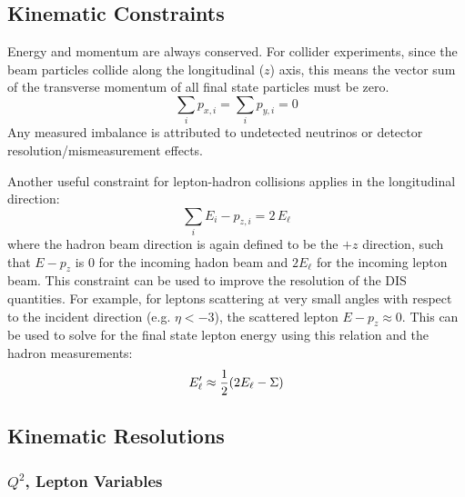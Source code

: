 \documentclass[12pt]{article}
\begin{document}
\subsection{Kinematic Constraints}

Energy and momentum are always conserved. For collider experiments,
since the beam particles collide along the longitudinal ($z$) axis, this
means the vector sum of the transverse momentum of all final state
particles must be zero.
%
\begin{equation}
\sum_i p_{x,i} = \sum_i p_{y,i} = 0
\label{eq:ptsum}
\end{equation}
%
Any measured imbalance is attributed to
undetected neutrinos or detector resolution/mismeasurement effects. 

Another useful constraint for lepton-hadron collisions applies in the
longitudinal direction:
%
\begin{equation}
\sum_i E_{i} - p_{z,i} = 2\,E_{\ell}
\label{eq:ptsum}
\end{equation}
%
where the hadron beam direction is again defined to be the $+z$
direction, such that $E-p_z$ is 0 for the incoming hadon beam and
$2E_\ell$ for the incoming lepton beam.  This constraint can be used
to improve the resolution of the DIS quantities. For example, for
leptons scattering at very small angles with respect to the incident
direction (e.g. $\eta < -3$), the scattered lepton $E-p_z\approx
0$. This can be used to solve for the final state lepton energy using
this relation and the hadron measurements:
%
\begin{equation}
E^\prime_\ell \approx {1\over 2}(2 E_\ell - \Sigma)
\label{eq:leptonenergy}
\end{equation}
%



\subsection{Kinematic Resolutions}

\subsubsection{$Q^2$, Lepton Variables}
\end{document}

